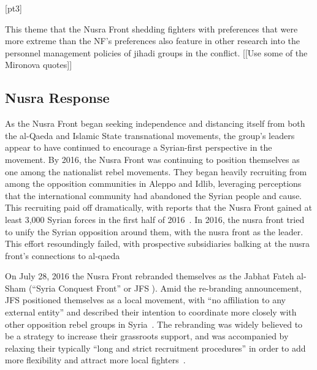  [pt3]

This theme that the Nusra Front shedding fighters with preferences that were more extreme than the NF’s preferences also feature in other research into the personnel management policies of jihadi groups in the conflict. [[Use some of the Mironova quotes]]

\subsection{Nusra Response}

As the Nusra Front began seeking independence and distancing itself from both the al-Qaeda and Islamic State transnational movements, the group’s leaders appear to have continued to encourage a Syrian-first perspective in the movement. By 2016, the Nusra Front was continuing to position themselves as one among the nationalist rebel movements. They began heavily recruiting from among the opposition communities in Aleppo and Idlib, leveraging perceptions that the international community had abandoned the Syrian people and cause. This recruiting paid off dramatically, with reports that the Nusra Front gained at least 3,000 Syrian forces in the first half of 2016~\autocite[6]{lister2016profiling}. In 2016, the nusra front tried to unify the Syrian opposition around them, with the nusra front as the leader. This effort resoundingly failed, with prospective subsidiaries balking at the nusra front’s connections to al-qaeda %

 On July 28, 2016 the Nusra Front rebranded themselves as the Jabhat Fateh al-Sham (“Syria Conquest Front” or JFS ). Amid the re-branding announcement, JFS positioned themselves as a local movement, with “no affiliation to any external entity” and described their intention to coordinate more closely with other opposition rebel groups in Syria~\autocite{jabhatfs2016announce, jabhatfs2016break}. The rebranding was widely believed to be a strategy to increase their grassroots support, and was accompanied by relaxing their typically “long and strict recruitment procedures” in order to add more flexibility and attract more local fighters~\autocite{haid2017behind}.

